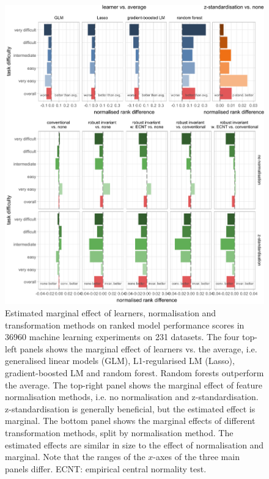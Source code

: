 \documentclass[
  a4paper,
]{article}
\begin{document}
\begin{figure}

{\centering \includegraphics{manuscript_files/figure-latex/marginal-effect-plot-1} 

}

\caption{Estimated marginal effect of learners, normalisation and transformation methods on ranked model performance scores in 36960 machine learning experiments on 231 datasets. The four top-left panels shows the marginal effect of learners vs. the average, i.e. generalised linear models (GLM), L1-regularised LM (Lasso), gradient-boosted LM and random forest. Random forests outperform the average. The top-right panel shows the marginal effect of feature normalisation methods, i.e. no normalisation and z-standardisation. z-standardisation is generally beneficial, but the estimated effect is marginal. The bottom panel shows the marginal effects of different transformation methods, split by normalisation method. The estimated effects are similar in size to the effect of normalisation and marginal. Note that the ranges of the $x$-axes of the three main panels differ. ECNT: empirical central normality test.}\label{fig:marginal-effect-plot}
\end{figure}
\end{document}
